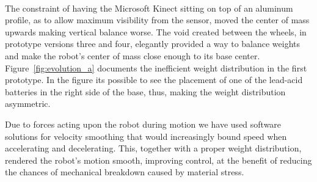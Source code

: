 The constraint of having the Microsoft Kinect\textsuperscript{\textregistered} sitting on top of an aluminum profile, as to allow maximum visibility from the sensor, moved the center of mass upwards making vertical balance worse. The void created between the wheels, in prototype versions three and four, elegantly provided a way to balance weights and make the robot's center of mass close enough to its base center. Figure~\ref{fig:evolution_a} documents the inefficient weight distribution in the first prototype. In the figure its possible to see the placement of one of the lead-acid batteries in the right side of the base, thus, making the weight distribution asymmetric.

Due to forces acting upon the robot during motion we have used software solutions for velocity smoothing that would increasingly bound speed when accelerating and decelerating. This, together with a proper weight distribution, rendered the robot's motion smooth, improving control, at the benefit of reducing the chances of mechanical breakdown caused by material stress.

